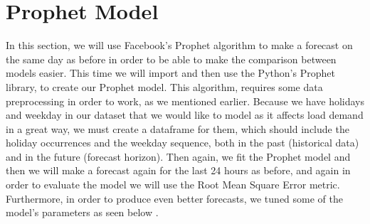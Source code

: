 \section{Prophet Model}
In this section, we will use Facebook's Prophet algorithm to make a forecast on the same day as before in order to be able to make the comparison between models easier. This time we will import and then use the Python's Prophet library, to create our Prophet model. This algorithm, requires some data preprocessing in order to work, as we mentioned earlier. Because we have holidays and weekday in our dataset that we would like to model as it affects load demand in a great way, we must create a dataframe for them, which should include the holiday occurrences and the weekday sequence, both in the past (historical data) and in the future (forecast horizon). Then again, we fit the Prophet model and then we will make a forecast again for the last 24 hours as before, and again in order to evaluate the model we will use the Root Mean Square Error metric. Furthermore, in order to produce even better forecasts, we tuned some of the model's parameters as seen below \cite{prophet}.
